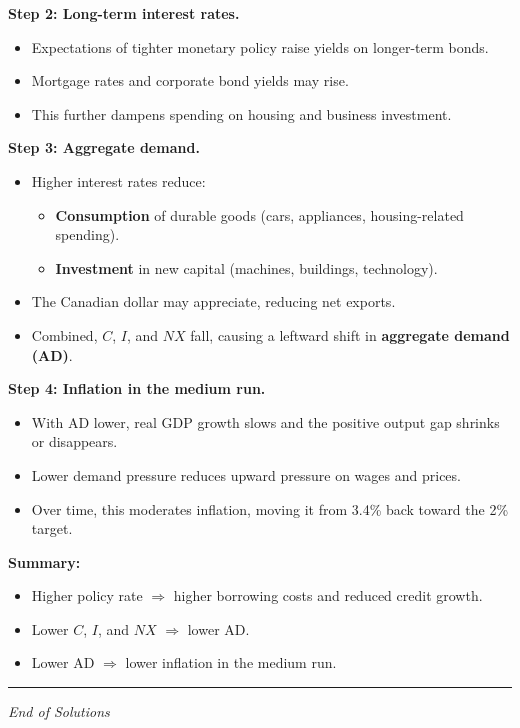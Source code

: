 \documentclass[12pt]{article}
\begin{document}
\textbf{Step 2: Long-term interest rates.}
\begin{itemize}
    \item Expectations of tighter monetary policy raise yields on longer-term bonds.
    \item Mortgage rates and corporate bond yields may rise.
    \item This further dampens spending on housing and business investment.
\end{itemize}

\newpage

\textbf{Step 3: Aggregate demand.}
\begin{itemize}
    \item Higher interest rates reduce:
    \begin{itemize}
        \item \textbf{Consumption} of durable goods (cars, appliances, housing-related spending).
        \item \textbf{Investment} in new capital (machines, buildings, technology).
    \end{itemize}
    \item The Canadian dollar may appreciate, reducing net exports.
    \item Combined, $C$, $I$, and $NX$ fall, causing a leftward shift in \textbf{aggregate demand (AD)}.
\end{itemize}

\textbf{Step 4: Inflation in the medium run.}
\begin{itemize}
    \item With AD lower, real GDP growth slows and the positive output gap shrinks or disappears.
    \item Lower demand pressure reduces upward pressure on wages and prices.
    \item Over time, this moderates inflation, moving it from 3.4\% back toward the 2\% target.
\end{itemize}

\textbf{Summary:}
\begin{itemize}
    \item Higher policy rate $\Rightarrow$ higher borrowing costs and reduced credit growth.
    \item Lower $C$, $I$, and $NX$ $\Rightarrow$ lower AD.
    \item Lower AD $\Rightarrow$ lower inflation in the medium run.
\end{itemize}

\hrule
\vspace{1em}

\begin{center}
\textit{End of Solutions}
\end{center}
\end{document}

